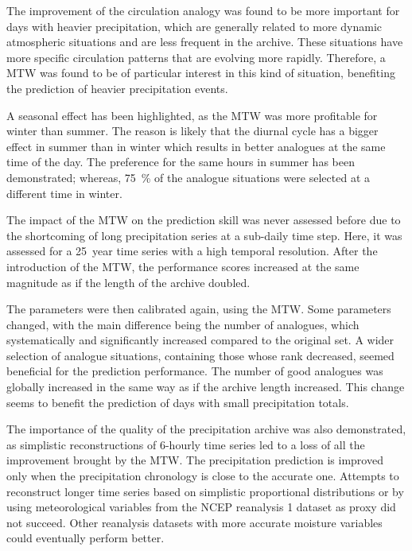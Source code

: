 \documentclass[hess, manuscript]{copernicus}
\begin{document}
	The improvement of the circulation analogy was found to be more important for days with heavier precipitation, which are generally related to more dynamic atmospheric situations and are less frequent in the archive. These situations have more specific circulation patterns that are evolving more rapidly. Therefore, a MTW was found to be of particular interest in this kind of situation, benefiting the prediction of heavier precipitation events.
	
	A seasonal effect has been highlighted, as the MTW was more profitable for winter than summer. The reason is likely that the diurnal cycle has a bigger effect in summer than in winter which results in better analogues at the same time of the day. The preference for the same hours in summer has been demonstrated; whereas, 75~\% of the analogue situations were selected at a different time in winter.
	
	The impact of the MTW on the prediction skill was never assessed before due to the shortcoming of long precipitation series at a sub-daily time step. Here, it was assessed for a 25~year time series with a high temporal resolution. After the introduction of the MTW, the performance scores increased at the same magnitude as if the length of the archive doubled.
	
	The parameters were then calibrated again, using the MTW. Some parameters changed, with the main difference being the number of analogues, which systematically and significantly increased compared to the original set. A wider selection of analogue situations, containing those whose rank decreased, seemed beneficial for the prediction performance. The number of good analogues was globally increased in the same way as if the archive length increased. This change seems to benefit the prediction of days with small precipitation totals.
	
	The importance of the quality of the precipitation archive was also demonstrated, as simplistic reconstructions of 6-hourly time series led to a loss of all the improvement brought by the MTW. The precipitation prediction is improved only when the precipitation chronology is close to the accurate one. Attempts to reconstruct longer time series based on simplistic proportional distributions or by using meteorological variables from the NCEP reanalysis 1 dataset as proxy did not succeed. Other reanalysis datasets with more accurate moisture variables could eventually perform better.
	
\end{document}
